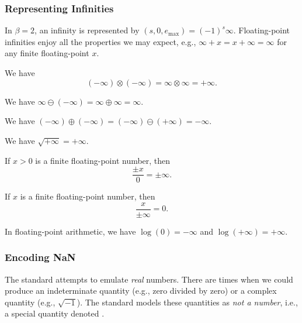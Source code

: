 \subsubsection{Representing Infinities}

In $\beta=2$, an infinity is represented by $(s,0,e_{\text{max}})=(-1)^{s}\infty$.
Floating-point infinities enjoy all the properties we may expect, e.g.,
$\infty + x = x + \infty = \infty$ for any finite floating-point $x$.

\begin{axiom}
  We have
  \begin{equation*}
    (-\infty)\otimes(-\infty) = \infty\otimes\infty = +\infty.
  \end{equation*}
\end{axiom}
\begin{axiom}
  We have $\infty\ominus(-\infty)=\infty\oplus\infty=\infty$.
\end{axiom}
\begin{axiom}
  We have $(-\infty)\oplus(-\infty)=(-\infty)\ominus(+\infty)=-\infty$.
\end{axiom}
\begin{axiom}
  We have $\sqrt{+\infty}=+\infty$.
\end{axiom}
\begin{axiom}
  If $x>0$ is a finite floating-point number, then
  \begin{equation*}
    \frac{\pm x}{0} = \pm\infty.
  \end{equation*}
\end{axiom}
\begin{axiom}
  If $x$ is a finite floating-point number, then
  \begin{equation*}
    \frac{x}{\pm\infty}=0.
  \end{equation*}
\end{axiom}
\begin{axiom}
 In floating-point arithmetic, we have $\log(0)=-\infty$ and $\log(+\infty)=+\infty$.
\end{axiom}

\subsubsection{Encoding NaN}

The  standard attempts to emulate \emph{real} numbers. There
are times when we could produce an indeterminate quantity (e.g., zero divided
by zero) or a complex quantity (e.g., $\sqrt{-1}$). The standard models
these quantities as \emph{not a number}, i.e., a special quantity
denoted \NaN.

